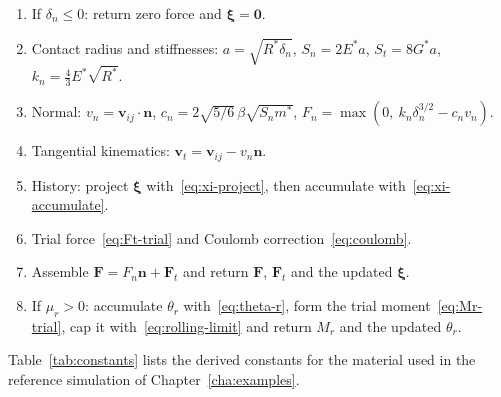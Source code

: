 \begin{enumerate}[leftmargin=2.4em,label=\textbf{\arabic*.}]
  \item If $\delta_{n}\le0$: return zero force and $\boldsymbol{\xi}=\mathbf{0}$.
  \item Contact radius and stiffnesses:
        $a=\sqrt{R^{*}\delta_{n}}$, $S_{n}=2E^{*}a$, $S_{t}=8G^{*}a$,
        $k_{n}=\tfrac{4}{3}E^{*}\sqrt{R^{*}}$.
  \item Normal: $v_{n}=\mathbf{v}_{ij}\cdot\mathbf{n}$,
        $c_{n}=2\sqrt{5/6}\,\beta\sqrt{S_{n}m^{*}}$,
        $F_{n}=\max(0,\ k_{n}\delta_{n}^{3/2}-c_{n}v_{n})$.
  \item Tangential kinematics: $\mathbf{v}_{t}=\mathbf{v}_{ij}-v_{n}\mathbf{n}$.
  \item History: project $\boldsymbol{\xi}$ with~\eqref{eq:xi-project}, then
        accumulate with~\eqref{eq:xi-accumulate}.
  \item Trial force~\eqref{eq:Ft-trial} and Coulomb
        correction~\eqref{eq:coulomb}.
  \item Assemble $\mathbf{F}=F_{n}\mathbf{n}+\mathbf{F}_{t}$ and return
        $\mathbf{F}$, $\mathbf{F}_{t}$ and the updated $\boldsymbol{\xi}$.
  \item If $\mu_{r}>0$: accumulate $\theta_{r}$ with~\eqref{eq:theta-r}, form
        the trial moment~\eqref{eq:Mr-trial}, cap it
        with~\eqref{eq:rolling-limit} and return $M_{r}$ and the updated
        $\theta_{r}$.
\end{enumerate}

Table~\ref{tab:constants} lists the derived constants for the material used in
the reference simulation of Chapter~\ref{cha:examples}.

